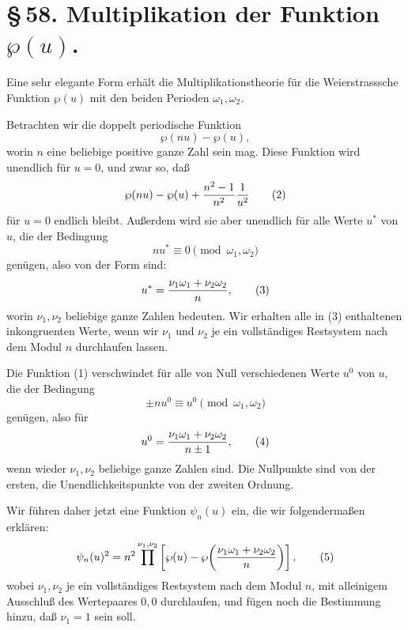 \documentclass[11pt]{article}
\begin{document}
\section*{\S\,58. Multiplikation der Funktion $\wp(u)$.}

Eine sehr elegante Form erhält die Multiplikationstheorie für die Weierstrasssche Funktion
$\wp(u)$ mit den beiden Perioden $\omega_1,\omega_2$.

Betrachten wir die doppelt periodische Funktion
\begin{equation}
\wp(nu)-\wp(u),
\tag{1}
\end{equation}
worin $n$ eine beliebige positive ganze Zahl sein mag. Diese Funktion wird unendlich für
$u=0$, und zwar so, daß
\begin{equation}
\wp(nu)-\wp(u)+{n^2-1\over n^2}{1\over u^2}
\tag{2}
\end{equation}
für $u=0$ endlich bleibt. Außerdem wird sie aber unendlich für alle Werte $u^*$ von $u$,
die der Bedingung
\[
nu^*\equiv 0\pmod{\omega_1,\omega_2}
\]
genügen, also von der Form sind:
\begin{equation}
u^*={\nu_1\omega_1+\nu_2\omega_2\over n},
\tag{3}
\end{equation}
worin $\nu_1,\nu_2$ beliebige ganze Zahlen bedeuten. Wir erhalten alle in (3) enthaltenen
inkongruenten Werte, wenn wir $\nu_1$ und $\nu_2$ je ein vollständiges Restsystem nach dem
Modul $n$ durchlaufen lassen.

Die Funktion (1) verschwindet für alle von Null verschiedenen Werte $u^0$ von $u$, die der
Bedingung
\[
\pm n u^0\equiv u^0 \pmod{\omega_1,\omega_2}
\]
genügen, also für
\begin{equation}
u^0={\nu_1\omega_1+\nu_2\omega_2\over n\pm1},
\tag{4}
\end{equation}
wenn wieder $\nu_1,\nu_2$ beliebige ganze Zahlen sind. Die Nullpunkte sind von der ersten,
die Unendlichkeitspunkte von der zweiten Ordnung.

Wir führen daher jetzt eine Funktion $\psi_n(u)$ ein, die wir folgendermaßen erklären:
\begin{equation}
\psi_n(u)^2=n^2\prod^{\nu_1,\nu_2}
\left[\wp(u)-\wp\!\left({\nu_1\omega_1+\nu_2\omega_2\over n}\right)\right],
\tag{5}
\end{equation}
wobei $\nu_1,\nu_2$ je ein vollständiges Restsystem nach dem Modul $n$, mit alleinigem
Ausschluß des Wertepaares $0,0$ durchlaufen, und fügen noch die Bestimmung hinzu, daß
$\nu_1=1$ sein soll.
\end{document}
